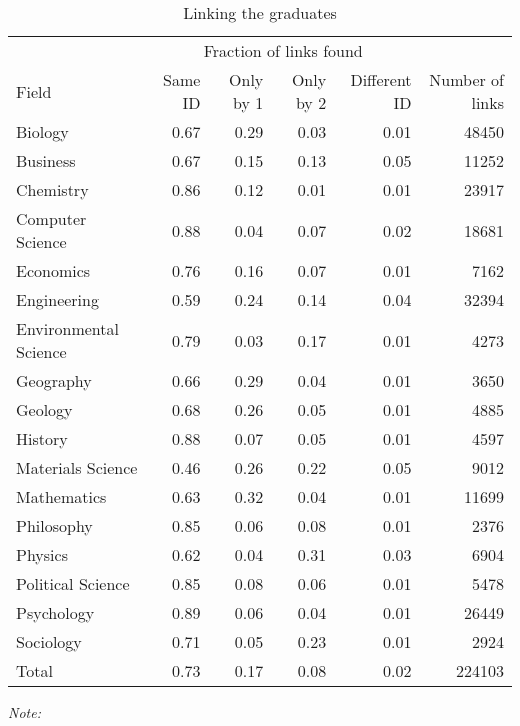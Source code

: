 \begin{table}

\caption{\label{tab:compare_linking_graduates}Linking the graduates}
\centering
\fontsize{9}{11}\selectfont
\begin{threeparttable}
\begin{tabular}[t]{lrrrrr}
\toprule
\multicolumn{1}{c}{ } & \multicolumn{4}{c}{Fraction of links found} & \multicolumn{1}{c}{ } \\
Field & Same ID & Only by 1 & Only by 2 & Different ID & Number of links\\
\midrule
Biology & 0.67 & 0.29 & 0.03 & 0.01 & 48450\\
Business & 0.67 & 0.15 & 0.13 & 0.05 & 11252\\
Chemistry & 0.86 & 0.12 & 0.01 & 0.01 & 23917\\
Computer Science & 0.88 & 0.04 & 0.07 & 0.02 & 18681\\
Economics & 0.76 & 0.16 & 0.07 & 0.01 & 7162\\
\addlinespace
Engineering & 0.59 & 0.24 & 0.14 & 0.04 & 32394\\
Environmental Science & 0.79 & 0.03 & 0.17 & 0.01 & 4273\\
Geography & 0.66 & 0.29 & 0.04 & 0.01 & 3650\\
Geology & 0.68 & 0.26 & 0.05 & 0.01 & 4885\\
History & 0.88 & 0.07 & 0.05 & 0.01 & 4597\\
\addlinespace
Materials Science & 0.46 & 0.26 & 0.22 & 0.05 & 9012\\
Mathematics & 0.63 & 0.32 & 0.04 & 0.01 & 11699\\
Philosophy & 0.85 & 0.06 & 0.08 & 0.01 & 2376\\
Physics & 0.62 & 0.04 & 0.31 & 0.03 & 6904\\
Political Science & 0.85 & 0.08 & 0.06 & 0.01 & 5478\\
\addlinespace
Psychology & 0.89 & 0.06 & 0.04 & 0.01 & 26449\\
Sociology & 0.71 & 0.05 & 0.23 & 0.01 & 2924\\
\midrule
Total & 0.73 & 0.17 & 0.08 & 0.02 & 224103\\
\bottomrule
\end{tabular}
\begin{tablenotes}[para]
\small
\item \textit{Note: } 

\end{tablenotes}
\end{threeparttable}
\end{table}
